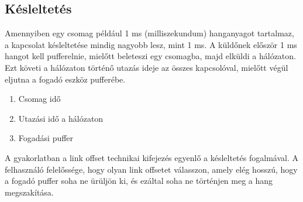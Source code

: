 \subsection{Késleltetés}
Amennyiben egy csomag például 1 ms (milliszekundum) hanganyagot tartalmaz, a kapcsolat
késleltetése mindig nagyobb lesz, mint 1 ms.
A küldőnek először 1 ms hangot kell pufferelnie, mielőtt beleteszi egy csomagba, majd elküldi a hálózaton.
Ezt követi a hálózaton történő utazás ideje az összes kapcsolóval, mielőtt végül eljutna a fogadó eszköz pufferébe.
\begin{enumerate}
    \item Csomag idő
    \item Utazási idő a hálózaton
    \item Fogadási puffer
\end{enumerate}
A gyakorlatban a link offset technikai kifejezés egyenlő a késleltetés fogalmával.
A felhasználó felelőssége, hogy olyan link offsetet válasszon, amely elég hosszú, hogy a fogadó puffer soha ne ürüljön ki, és
ezáltal soha ne történjen meg a hang megszakítása. 
